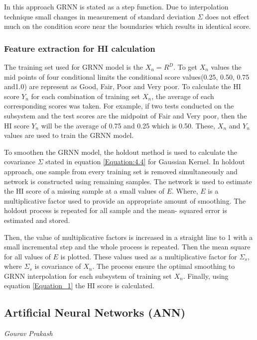 In this approach GRNN is stated as a step function. Due to interpolation technique small changes in measurement of
standard deviation $\Sigma$ does not effect much on the condition score near the boundaries which results in identical
score.

\subsubsection{Feature extraction for HI calculation}
The training set used for GRNN model is the $X_n=R^D$. To get $X_n$ values the mid points of four conditional limits
the conditional score  values(0.25, 0.50, 0.75 and1.0) are represent as Good, Fair, Poor and Very poor. To calculate
the HI score $Y_n$ for each combination of training set $X_n$, the average of each corresponding scores was taken. For
example, if two tests conducted on the subsystem and the test scores are the midpoint of Fair and Very poor, then the
HI score $Y_n$ will be the average of 0.75 and 0.25 which is 0.50. These, $X_n$ and $Y_n$ values are used to train the
GRNN model.

To smoothen the GRNN model, the holdout method is used to calculate the covariance $\Sigma$ stated in
equation \ref{Equation:4.4} for Gaussian Kernel. In holdout approach, one sample from every training set is removed simultaneously and
network is constructed using remaining samples. The network is used to estimate the HI score of a missing sample at a
small values of $E$. Where, $E$ is a multiplicative factor used to provide an appropriate amount of smoothing. The
holdout process is repeated for all sample and the mean- squared error is estimated and stored.

Then, the value of
multiplicative factors is increased in a straight line to 1 with a small incremental step and the whole process is
repeated. Then the mean square for all values of $E$ is plotted. These values used as a multiplicative factor for
$\Sigma_s$, where $\Sigma_s$ is covariance of $X_n$. The process ensure the optimal smoothing to GRNN interpolation for
each subsystem of training set $X_n$. Finally, using equation \ref{Equation_1} the HI score is calculated.


\subsection{Artificial Neural Networks (ANN)}
\vspace*{-12.5mm}\hfill{\normalsize\emph{Gourav Prakash}}
\label{sec:hi_estimation:approaches:hi_based_rul}

